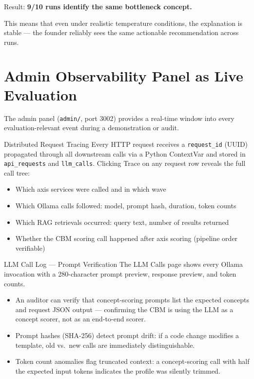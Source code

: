 \documentclass[11pt,a4paper]{article}
\begin{document}
Result: \textbf{9/10 runs identify the same bottleneck concept.}

This means that even under realistic temperature conditions, the explanation is stable —
the founder reliably sees the same actionable recommendation across runs.

\section{Admin Observability Panel as Live Evaluation}

The admin panel (\texttt{admin/}, port 3002) provides a real-time window into every
evaluation-relevant event during a demonstration or audit.

\begin{adminbox}{Distributed Request Tracing}
Every HTTP request receives a \texttt{request\_id} (UUID) propagated through all downstream
calls via a Python ContextVar and stored in \texttt{api\_requests} and \texttt{llm\_calls}.
Clicking Trace on any request row reveals the full call tree:
\begin{itemize}[leftmargin=1em]
  \item Which axis services were called and in which wave
  \item Which Ollama calls followed: model, prompt hash, duration, token counts
  \item Which RAG retrievals occurred: query text, number of results returned
  \item Whether the CBM scoring call happened after axis scoring (pipeline order verifiable)
\end{itemize}
\end{adminbox}

\begin{adminbox}{LLM Call Log — Prompt Verification}
The LLM Calls page shows every Ollama invocation with a 280-character prompt preview,
response preview, and token counts.
\begin{itemize}[leftmargin=1em]
  \item An auditor can verify that concept-scoring prompts list the expected concepts
        and request JSON output — confirming the CBM is using the LLM as a concept
        scorer, not as an end-to-end scorer.
  \item Prompt hashes (SHA-256) detect prompt drift: if a code change modifies a template,
        old vs.\ new calls are immediately distinguishable.
  \item Token count anomalies flag truncated context: a concept-scoring call with half the
        expected input tokens indicates the profile was silently trimmed.
\end{itemize}
\end{adminbox}
\end{document}
